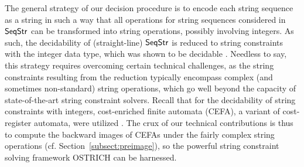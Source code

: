 The general strategy of our decision procedure is to encode each string sequence as a string in such a way that all operations for string sequences considered in ${\sf SeqStr}$ can be transformed into string operations, possibly involving integers. As such, the decidability of (straight-line) ${\sf SeqStr}$ is reduced to string constraints with the integer data type, which was shown to be decidable \cite{atva2020}. Needless to say, this strategy requires overcoming certain technical challenges, as the string constraints resulting from the reduction typically encompass complex (and sometimes non-standard) string operations, which go well beyond the capacity of state-of-the-art string constraint solvers. %
Recall that for the decidability of string constraints with integers, cost-enriched finite automata (CEFA), a variant of cost-register automata,  %
were utilized \cite{atva2020}. %
The crux of our technical contributions is thus to compute the backward images of CEFAs under the fairly complex string operations (cf. Section~\ref{subsect:preimage}), %
so the powerful string constraint solving framework  OSTRICH %
\cite{CCH+18,CHL+19} can be harnessed. %

